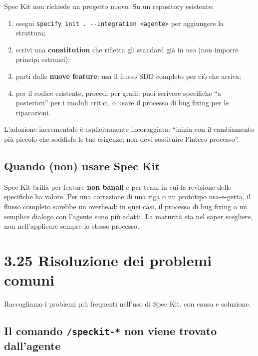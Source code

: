 \documentclass[
  italian,
  10pt,
]{book}
\providecommand{\tightlist}{%
  \setlength{\itemsep}{0pt}\setlength{\parskip}{0pt}}
\begin{document}
Spec Kit non richiede un progetto nuovo. Su un repository esistente:

\begin{enumerate}
\def\labelenumi{\arabic{enumi}.}
\tightlist
\item
  esegui
  \texttt{specify\ init\ .\ -\/-integration\ \textless{}agente\textgreater{}}
  per aggiungere la struttura;
\item
  scrivi una \textbf{constitution} che rifletta gli standard già in uso
  (non imporre principi estranei);
\item
  parti dalle \textbf{nuove feature}: usa il flusso SDD completo per ciò
  che arriva;
\item
  per il codice esistente, procedi per gradi: puoi scrivere specifiche
  ``a posteriori'' per i moduli critici, o usare il processo di bug
  fixing per le riparazioni.
\end{enumerate}

L'adozione incrementale è esplicitamente incoraggiata: ``inizia con il
cambiamento più piccolo che soddisfa le tue esigenze; non devi
sostituire l'intero processo''.

\subsection{Quando (non) usare Spec
Kit}\label{quando-non-usare-spec-kit}

Spec Kit brilla per feature \textbf{non banali} e per team in cui la
revisione delle specifiche ha valore. Per una correzione di una riga o
un prototipo usa-e-getta, il flusso completo sarebbe un overhead: in
quei casi, il processo di bug fixing o un semplice dialogo con l'agente
sono più adatti. La maturità sta nel saper scegliere, non nell'applicare
sempre lo stesso processo.

\section{3.25 Risoluzione dei problemi
comuni}\label{risoluzione-dei-problemi-comuni}

Raccogliamo i problemi più frequenti nell'uso di Spec Kit, con causa e
soluzione.

\subsection{\texorpdfstring{Il comando \texttt{/speckit-*} non viene
trovato
dall'agente}{Il comando /speckit-* non viene trovato dall'agente}}\label{il-comando-speckit--non-viene-trovato-dallagente}
\end{document}
